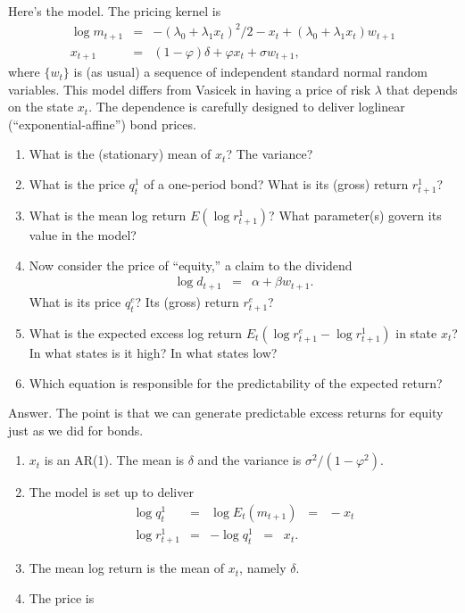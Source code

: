 \documentclass[11pt]{article}
\begin{document}
\begin{enumerate}
Here's the model.  The pricing kernel is
\begin{eqnarray*}
    \log m_{t+1} &=& - (\lambda_0 + \lambda_1 x_t)^2/2 - x_t
                + (\lambda_0 + \lambda_1 x_t) w_{t+1} \\
        x_{t+1} &=& (1-\varphi) \delta + \varphi x_t + \sigma w_{t+1} ,
\end{eqnarray*}
where $\{ w_t \}$ is (as usual) a sequence of independent standard normal random variables.
This model differs from Vasicek in having a price of risk $\lambda$ that
depends on the state $x_t$.
The dependence is carefully designed to deliver loglinear (``exponential-affine'')
bond prices.
%
\begin{enumerate}
\item  What is the (stationary) mean of $x_t$?  The variance?
\item  What is the price $q^1_t$ of a one-period bond?
What is its (gross) return $r^1_{t+1}$?
\item  What is the mean log return $E (\log r^1_{t+1})$?
What parameter(s) govern its value in the model?
\item  Now consider the price of ``equity,'' a claim to the dividend
\begin{eqnarray*}
    \log d_{t+1} &=&  \alpha + \beta w_{t+1} .
\end{eqnarray*}
What is its price $q^e_t$?
Its (gross) return $r^e_{t+1}$?
\item  What is the expected excess log return $ E_t (\log r^e_{t+1} - \log r^1_{t+1})$ in state $x_t$?
In what states is it high?  In what states low?
\item  Which equation is responsible for the predictability of the expected return?
\end{enumerate}
%
Answer.
The point is that we can generate predictable excess
returns for equity just as we did for bonds.
\begin{enumerate}
\item  $x_t$ is an AR(1).
The mean is $\delta$ and the variance is $\sigma^2/(1-\varphi^2)$.
\item   The model is set up to deliver
\begin{eqnarray*}
    \log q^1_t &=& \log E_t (m_{t+1}) \;\;=\;\; - x_t \\
    \log r^1_{t+1} &=& - \log q^1_t \;\;=\;\; x_t .
\end{eqnarray*}
\item  The mean log return is the mean of $x_t$, namely $\delta$.
\item  The price is

\end{enumerate}
\end{enumerate}
\end{document}
